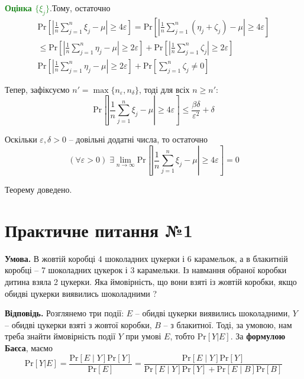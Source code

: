 \documentclass[14pt]{extarticle}
\newcommand{\<}{\langle}
\renewcommand{\>}{\rangle}
\theoremstyle{mystyle}{\newtheorem{definition}{Definition}[section]}
\theoremstyle{mystyle}{\newtheorem{proposition}[definition]{Proposition}}
\theoremstyle{mystyle}{\newtheorem{theorem}[definition]{Theorem}}
\theoremstyle{mystyle}{\newtheorem{lemma}[definition]{Lemma}}
\theoremstyle{mystyle}{\newtheorem{corollary}[definition]{Corollary}}
\theoremstyle{mystyle}{\newtheorem*{remark}{Remark}}
\theoremstyle{mystyle}{\newtheorem*{remarks}{Remarks}}
\theoremstyle{mystyle}{\newtheorem*{example}{Example}}
\theoremstyle{mystyle}{\newtheorem*{examples}{Examples}}
\theoremstyle{definition}{\newtheorem*{exercise}{Exercise}}
\theoremstyle{cstyle}{\newtheorem*{cthm}{}}
\theoremstyle{warn}
\begin{document}
\textcolor{ForestGreen}{\textbf{Оцінка $\{\xi_j\}$}}.Тому, остаточно
\begin{gather}
    \text{Pr}\left[\left|\frac{1}{n}\sum_{j=1}^n \xi_j - \mu\right| \geq 4\varepsilon\right] = \text{Pr}\left[\left|\frac{1}{n}\sum_{j=1}^n (\eta_j+\zeta_j) - \mu\right| \geq 4\varepsilon\right] \nonumber \\
    \leq \text{Pr}\left[\left|\frac{1}{n}\sum_{j=1}^n \eta_j - \mu\right| \geq 2\varepsilon\right] + \text{Pr}\left[\left|\frac{1}{n}\sum_{j=1}^n \zeta_j\right|\geq 2\varepsilon\right] \nonumber \\
    \text{Pr}\left[\left|\frac{1}{n}\sum_{j=1}^n \eta_j - \mu\right|\geq 2\varepsilon\right] + \text{Pr}\left[\sum_{j=1}^n \zeta_j \neq 0\right]
\end{gather}

Тепер, зафіксуємо $n' = \max\{n_{\varepsilon},n_{\delta}\}$, тоді для всіх $n \geq n'$:
\begin{equation}
    \text{Pr}\left[\left|\frac{1}{n}\sum_{j=1}^n \xi_j - \mu\right| \geq 4\varepsilon\right] \leq \frac{\beta\delta}{\varepsilon^2} + \delta
\end{equation}

Оскільки $\varepsilon,\delta > 0$ -- довільні додатні числа, то остаточно
\begin{equation}
    (\forall \varepsilon > 0) \; \exists \lim_{n \to \infty}\text{Pr}\left[\left|\frac{1}{n}\sum_{j=1}^n \xi_j - \mu\right| \geq 4\varepsilon\right] = 0
\end{equation}

Теорему доведено.

\pagebreak

\section{Практичне питання №1}

\textbf{Умова.} В жовтій коробці 4 шоколадних цукерки і 6 карамельок, а в блакитній коробці -- 7 шоколадних
цукерок і 3 карамельки. Із навмання обраної коробки дитина взяла 2 цукерки. Яка
ймовірність, що вони взяті із жовтій коробки, якщо обидві цукерки виявились шоколадними
?

\textbf{Відповідь.} Розглянемо три події: $E$ -- обидві цукерки виявились шоколадними, $Y$ -- обидві цукерки взяті з жовтої коробки, $B$ -- з блакитної. Тоді, за умовою, нам треба знайти ймовірність події $Y$ при умові $E$, тобто $\text{Pr}[Y|E]$. 
За \textbf{формулою Баєса}, маємо
\begin{equation}
    \text{Pr}[Y|E] = \frac{\text{Pr}[E \mid Y]\text{Pr}[Y]}{\text{Pr}[E]} = \frac{\text{Pr}[E \mid Y]\text{Pr}[Y]}{\text{Pr}[E \mid Y]\text{Pr}[Y] + \text{Pr}[E \mid B]\text{Pr}[B]}
\end{equation}
\end{document}
